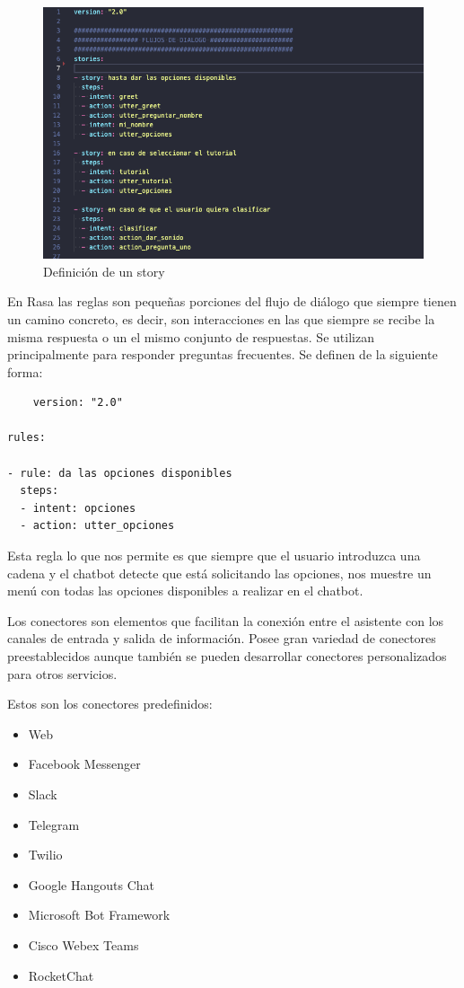 \begin{figure}[H]
    \centering
    \includegraphics[width=\textwidth]{include/capturas/RasaStories.png}
    \caption{Definición de un story}
    \label{fig:rasa_story}
\end{figure}


En Rasa las reglas son pequeñas porciones del flujo de diálogo que siempre tienen un camino concreto, es decir, son interacciones en las que siempre se recibe la misma respuesta o un el mismo conjunto de respuestas. Se utilizan principalmente para responder preguntas frecuentes. Se definen de la siguiente forma:

\begin{lstlisting}
    version: "2.0"

rules:

- rule: da las opciones disponibles
  steps:
  - intent: opciones
  - action: utter_opciones
\end{lstlisting}

Esta regla lo que nos permite es que siempre que el usuario introduzca una cadena y el chatbot detecte que está solicitando las opciones, nos muestre un menú con todas las opciones disponibles a realizar en el chatbot.


Los conectores son elementos que facilitan la conexión entre el asistente con los canales de entrada y salida de información. Posee gran variedad de conectores preestablecidos aunque también se pueden desarrollar conectores personalizados para otros servicios.

Estos son los conectores predefinidos:
\begin{itemize}
    \item Web
    \item Facebook Messenger
    \item Slack
    \item Telegram
    \item Twilio
    \item Google Hangouts Chat
    \item Microsoft Bot Framework
    \item Cisco Webex Teams
    \item RocketChat
\end{itemize}

